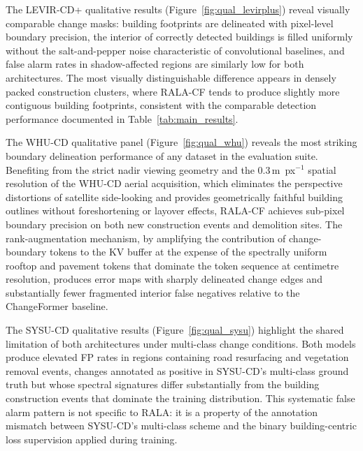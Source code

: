The LEVIR-CD+ qualitative results (Figure~\ref{fig:qual_levirplus}) reveal visually comparable change masks: building footprints are delineated with pixel-level boundary precision, the interior of correctly detected buildings is filled uniformly without the salt-and-pepper noise characteristic of convolutional baselines, and false alarm rates in shadow-affected regions are similarly low for both architectures. The most visually distinguishable difference appears in densely packed construction clusters, where \ac{RALA-CF} tends to produce slightly more contiguous building footprints, consistent with the comparable detection performance documented in Table~\ref{tab:main_results}.

The WHU-CD qualitative panel (Figure~\ref{fig:qual_whu}) reveals the most striking boundary delineation performance of any dataset in the evaluation suite. Benefiting from the strict nadir viewing geometry and the $0.3\,\mathrm{m}$~px$^{-1}$ spatial resolution of the WHU-CD aerial acquisition, which eliminates the perspective distortions of satellite side-looking and provides geometrically faithful building outlines without foreshortening or layover effects, \ac{RALA-CF} achieves sub-pixel boundary precision on both new construction events and demolition sites. The rank-augmentation mechanism, by amplifying the contribution of change-boundary tokens to the \ac{KV} buffer at the expense of the spectrally uniform rooftop and pavement tokens that dominate the token sequence at centimetre resolution, produces error maps with sharply delineated change edges and substantially fewer fragmented interior false negatives relative to the ChangeFormer baseline.

The SYSU-CD qualitative results (Figure~\ref{fig:qual_sysu}) highlight the shared limitation of both architectures under multi-class change conditions. Both models produce elevated \ac{FP} rates in regions containing road resurfacing and vegetation removal events, changes annotated as positive in SYSU-CD's multi-class ground truth but whose spectral signatures differ substantially from the building construction events that dominate the training distribution. This systematic false alarm pattern is not specific to \ac{RALA}: it is a property of the annotation mismatch between SYSU-CD's multi-class scheme and the binary building-centric loss supervision applied during training.

